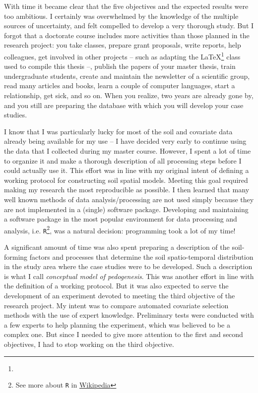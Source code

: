 With time it became clear that the five objectives and the expected results were too ambitious. I certainly 
was overwhelmed by the knowledge of the multiple sources of uncertainty, and felt compelled to develop a very 
thorough study. But I forgot that a doctorate course includes more activities than those planned in the 
research project: you take classes, prepare grant proposals, write reports, help colleagues, get involved in 
other projects -- such as adapting the \LaTeX{}\footnote{\footlatex} class used to compile this thesis --, 
publish the papers of your master thesis, train undergraduate students, create and maintain the newsletter of 
a scientific group, read many articles and books, learn a couple of computer languages, start a relationship, 
get sick, and so on. When you realize, two years are already gone by, and you still are preparing the database 
with 
which you will develop your case studies.

\def\footr{See more about \texttt{R} in 
\href{https://en.wikipedia.org/wiki/R_\%28programming_language\%29}{Wikipedia}}

I know that I was particularly lucky for most of the soil and covariate data already being available for my 
use -- I have decided very early to continue using the data that I collected during my master course. However, 
I spent a lot of time to organize it and make a thorough description of all processing steps before I could 
actually use it. This effort was in line with my original intent of defining a working protocol for 
constructing soil spatial models. Meeting this goal required making my research the most reproducible as 
possible. I then learned that many well known methods of data analysis/processing are not used simply because 
they are not implemented in a (single) software package. Developing and maintaining a software package in the 
most popular environment for data processing and analysis, i.e. \texttt{R}\footnote{\footr}, was a natural 
decision: programming took a lot of my time!

A significant amount of time was also spent preparing a description of the soil-forming factors and processes
that determine the soil spatio-temporal distribution in the study area where the case studies were to be 
developed. Such a description is what I call \emph{conceptual model of pedogenesis}. This was 
another effort in line with the definition of a working protocol. But it was also expected to serve the 
development of an experiment devoted to meeting the third objective of the research project. My intent was to 
compare automated covariate selection methods with the use of expert knowledge. Preliminary tests were 
conducted with a few experts to help planning the experiment, which was believed to be a complex one. But 
since I needed to give more attention to the first and second objectives, I had to stop working on the third 
objective.

